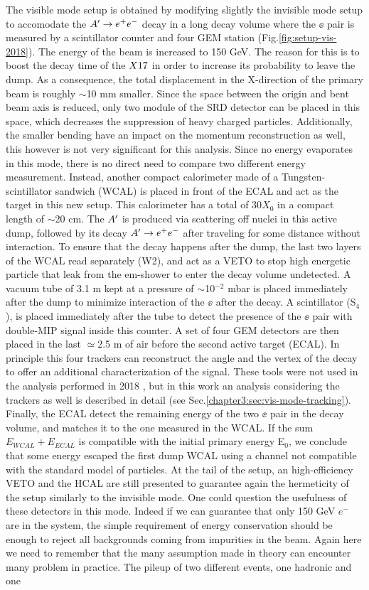 The visible mode setup is obtained by modifying slightly the invisible mode setup to accomodate the $A' \to e^+e^-$ decay in a long decay volume where the $\ee$ pair is measured by a scintillator counter and four GEM station (Fig.\ref{fig:setup-vis-2018}). The energy of the beam is increased to 150 GeV. The reason for this is to boost the decay time of the $X17$ in order to increase its probability to leave the dump. As a consequence, the total displacement in the X-direction of the primary beam is roughly $\sim$10 \si{mm} smaller. Since the space between the origin and bent beam axis is reduced, only two module of the SRD detector can be placed in this space, which decreases the suppression of heavy charged particles. Additionally, the smaller bending have an impact on the momentum reconstruction as well, this however is not very significant for this analysis. Since no energy evaporates in this mode, there is no direct need to compare two different energy measurement. Instead, another compact calorimeter made of a Tungsten-scintillator sandwich (WCAL) is placed in front of the ECAL and act as the target in this new setup. This calorimeter has a total of 30$X_0$ in a compact length of $\sim$20 \si{cm}. The $A'$ is produced via scattering off nuclei in this active dump, followed by its decay $A' \to e^+e^-$ after traveling for some distance without interaction. To ensure that the decay happens after the dump, the last two layers of the WCAL read separately (W2), and act as a VETO to stop high energetic particle that leak from the em-shower to enter the decay volume undetected. A vacuum tube of 3.1 \si{m} kept at a pressure of $\sim$10$^{-2}$ \si{mbar} is placed immediately after the dump to minimize interaction of the $\ee$ after the decay. A scintillator (S$_4$), is placed immediately after the tube to detect the presence of the $\ee$ pair with double-MIP signal inside this counter. A set of four GEM detectors are then placed in the last $\simeq$2.5 \si{m} of air before the second active target (ECAL). In principle this four trackers can reconstruct the angle and the vertex of the decay to offer an additional characterization of the signal. These tools were not used in the analysis performed in 2018 \cite{Banerjee:2019hmi}, but in this work an analysis considering the trackers as well is described in detail (see Sec.\ref{chapter3:sec:vis-mode-tracking}). Finally, the ECAL detect the remaining energy of the two $\ee$ pair in the decay volume, and matches it to the one measured in the WCAL. If the sum $E_{WCAL}+E_{ECAL}$ is compatible with the initial primary energy E$_0$, we conclude that some energy escaped the first dump WCAL using a channel not compatible with the standard model of particles. At the tail of the setup, an high-efficiency VETO and the HCAL are still presented to guarantee again the hermeticity of the setup similarly to the invisible mode. One could question the usefulness of these detectors in this mode. Indeed if we can guarantee that only 150 GeV $e^-$ are in the system, the simple requirement of energy conservation should be enough to reject all backgrounds coming from impurities in the beam. Again here we need to remember that the many assumption made in theory can encounter many problem in practice. The pileup of two different events, one hadronic and one 